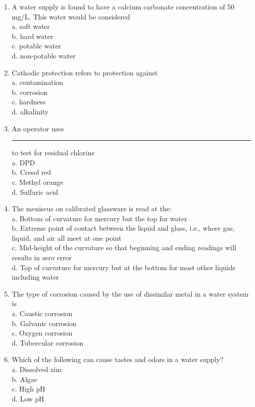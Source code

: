 \begin{enumerate}[1.]
\item A water supply is found to have a calcium carbonate concentration of 50 mg/L. This water would be considered\\
a.	soft water\\
b.	hard water\\
c.	potable water\\
d.	non-potable water\\

\item Cathodic protection refers to protection against\\
a.	contamination\\
b.	corrosion\\
c.	hardness\\
d.  alkalinity

\item An operator uses \rule{1.5cm}{0.3pt} to test for residual chlorine\\
a. DPD\\
b. Cresol red\\
c. Methyl orange\\
d. Sulfuric acid\\

\item The meniscus on calibrated glassware is read at the:\\
a. Bottom of curvature for mercury but the top for water\\
b. Extreme point of contact between the liquid and glass, i.e., where gas, liquid, and air all meet at one point\\
c. Mid-height of the curvature so that beginning and ending readings will results in zero error\\
d. Top of curvature for mercury but at the bottom for most other liquids including water

\item The type of corrosion caused by the use of dissimilar metal in a water system is\\
a. Caustic corrosion\\
b. Galvanic corrosion\\
c. Oxygen corrosion\\
d. Tubercular corrosion\\

\item Which of the following can cause tastes and odors in a water supply?\\
a. Dissolved zinc\\
b. Algae\\
c. High pH\\
d. Low pH\\




\end{enumerate}
